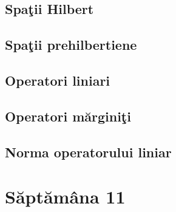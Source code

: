 \documentclass[a4paper,12pt]{article}
\theoremstyle{change}
\begin{document}

\subsection{Spaţii  Hilbert}

\subsection{Spaţii prehilbertiene}


\subsection{Operatori liniari}

\subsection{Operatori mărginiţi}


\subsection{Norma operatorului liniar}

\section{Săptămâna 11}
\end{document}

